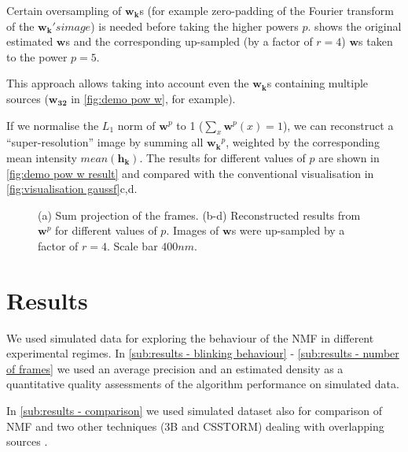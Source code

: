 Certain oversampling of $\bm{w_{k}}$s (for example zero-padding of the Fourier transform of the $\bm{w_{k}}'s image$) is needed before taking the higher powers $p$.  shows the original estimated $\bm{w}$s and the corresponding up-sampled (by a factor of $r=4$) $\bm{w}$s taken to the power $p=5$. 

This approach allows taking into account even the $\bm{w_{k}}$s containing multiple sources ($\bm{w_{32}}$ in \autoref{fig:demo pow w}, for example).

If we normalise the $L_{1}$ norm of $\bm{w}^{p}$ to 1 ($\sum_{x} \bm{w}^{p}(x)=1$), we can reconstruct a ``super-resolution'' image by summing all $\bm{w_{k}}^{p}$, weighted by the corresponding mean intensity $\unit{mean}(\bm{h_{k}})$. The results for different values of $p$ are shown in \autoref{fig:demo pow w result} and compared with the conventional visualisation in \autoref{fig:visualisation gaussf}c,d.

\begin{figure}[!hbt]
	\newcommand{\sizef}{.45}			
	\newcommand{\widthfig}{1\textwidth}	
	\centering
	\caption{(a) Sum projection of the frames. (b-d) Reconstructed results from $\bm{w}^{p}$ for different values of $p$. Images of $\bm{w}$s were up-sampled by a factor of $r=4$. Scale bar $400 \unit{nm}$.}
	\label{fig:demo pow w result}	
\end{figure}


\clearpage
\section{Results \label{sec:results}}
We used simulated data for exploring the behaviour of the NMF in different experimental regimes. In \autoref{sub:results - blinking behaviour} - \ref{sub:results - number of frames} we used an average precision and an estimated density as a quantitative quality assessments of the algorithm performance on simulated data. 

In \autoref{sub:results - comparison} we used simulated dataset also for comparison of NMF and two other techniques (3B and CSSTORM) dealing with overlapping sources .

